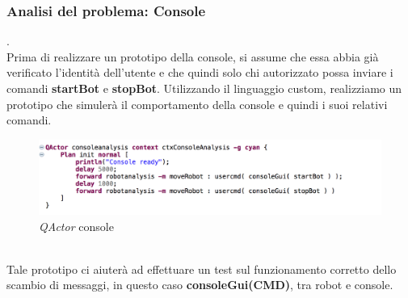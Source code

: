 \documentclass{llncs}
\newcommand{\qa}{\textsf{\textit{QActor }}}
\begin{document}
\subsubsection{Analisi del problema: Console} .
\label{AnalisidelproblemaReq1Console}
\vspace*{1ex}
\\
Prima di realizzare un prototipo della console, si assume che essa abbia gi\`a verificato l'identit\`a dell'utente e che quindi solo chi autorizzato possa inviare i comandi
\textbf{startBot} e \textbf{stopBot}.
Utilizzando il linguaggio custom, realizziamo un prototipo che simuler\`a il comportamento della console e quindi i suoi relativi comandi.\\
\begin{figure}
    \centering
    \includegraphics[width=1\textwidth]{Immagini/console(requisito1).png}
    \caption{\qa console}
    \label{fig:my_label}
\end{figure}
\vspace*{1ex}
\\
Tale prototipo ci aiuter\`a ad effettuare un test sul funzionamento corretto dello scambio di messaggi, in questo caso \textbf{consoleGui(CMD)}, tra robot e console. 

\end{document}
